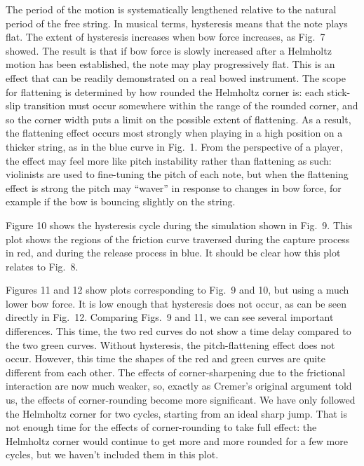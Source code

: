   The period of the motion is systematically lengthened relative to the natural 
  period of the free string. In musical terms, hysteresis means that the note 
  plays flat. The extent of hysteresis increases when bow force increases, as 
  Fig.\ 7 showed. The result is that if bow force is slowly increased after a 
  Helmholtz motion has been established, the note may play progressively flat. 
  This is an effect that can be readily demonstrated on a real bowed 
  instrument. The scope for flattening is determined by how rounded the 
  Helmholtz corner is: each stick-slip transition must occur somewhere within 
  the range of the rounded corner, and so the corner width puts a limit on the 
  possible extent of flattening. As a result, the flattening effect occurs most 
  strongly when playing in a high position on a thicker string, as in the blue 
  curve in Fig.\ 1. From the perspective of a player, the effect may feel more 
  like pitch instability rather than flattening as such: violinists are used to 
  fine-tuning the pitch of each note, but when the flattening effect is strong 
  the pitch may ``waver'' in response to changes in bow force, for example if 
  the bow is bouncing slightly on the string. 

  Figure 10 shows the hysteresis cycle during the simulation shown in Fig.\ 9. 
  This plot shows the regions of the friction curve traversed during the 
  capture process in red, and during the release process in blue. It should be 
  clear how this plot relates to Fig.\ 8. 


  Figures 11 and 12 show plots corresponding to Fig.\ 9 and 10, but using a 
  much lower bow force. It is low enough that hysteresis does not occur, as can 
  be seen directly in Fig.\ 12. Comparing Figs.\ 9 and 11, we can see several 
  important differences. This time, the two red curves do not show a time delay 
  compared to the two green curves. Without hysteresis, the pitch-flattening 
  effect does not occur. However, this time the shapes of the red and green 
  curves are quite different from each other. The effects of corner-sharpening 
  due to the frictional interaction are now much weaker, so, exactly as 
  Cremer’s original argument told us, the effects of corner-rounding become 
  more significant. We have only followed the Helmholtz corner for two cycles, 
  starting from an ideal sharp jump. That is not enough time for the effects of 
  corner-rounding to take full effect: the Helmholtz corner would continue to 
  get more and more rounded for a few more cycles, but we haven’t included them 
  in this plot. 

